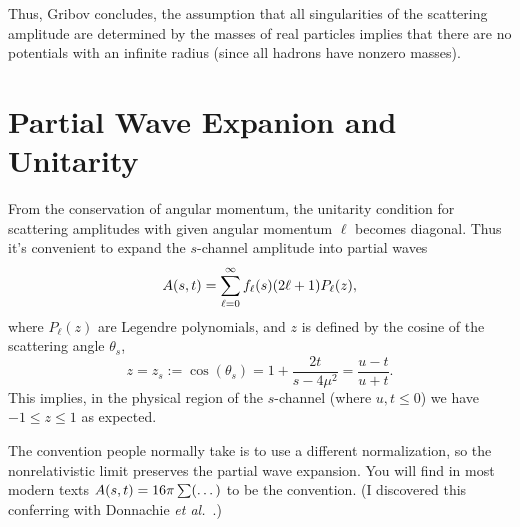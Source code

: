 \M[-1]
Thus, Gribov concludes, the assumption that all singularities of the
scattering amplitude are determined by the masses of real particles
implies that there are no potentials with an infinite radius (since all
hadrons have nonzero masses).

\section{Partial Wave Expanion and Unitarity}

From the conservation of angular momentum, the unitarity condition for
scattering amplitudes with given angular momentum $\ell$ becomes
diagonal. Thus it's convenient to expand the $s$-channel amplitude into
partial waves
\begin{equation}\label{eq:introduction:partial-wave-expansion}
A(s,t) = \sum^{\infty}_{\ell=0}f_{\ell}(s)(2\ell+1)P_{\ell}(z),
\end{equation}
where $P_{\ell}(z)$ are Legendre polynomials, and $z$ is defined by the
cosine of the scattering angle $\theta_{s}$,
\begin{equation}\label{eq:introduction:z-of-s}
z = z_{s} := \cos(\theta_{s}) = 1 + \frac{2t}{s-4\mu^{2}}=\frac{u-t}{u+t}.
\end{equation}
This implies, in the physical region of the $s$-channel (where
$u,t\leq0$) we have $-1\leq z\leq 1$ as expected.

The convention people normally take is to use a different normalization,
so the nonrelativistic limit preserves the partial wave expansion. You
will find in most modern texts $A(s,t)=16\pi\sum(\dots)$ to be
the convention. (I discovered this conferring with Donnachie \textit{et al.}~\cite{Donnachie:2002en}.)

